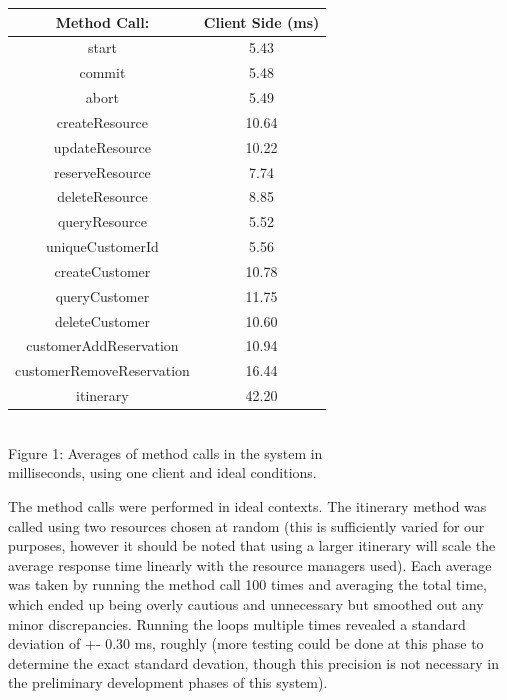 \documentclass[letterpaper,12pt]{article}
\begin{document}
	\begin{center}
		\begin{tabular}{ |c|c| } 
			\hline
			Method Call: & Client Side (ms) \\
			\hline
			start & 5.43  \\ 
			commit & 5.48  \\ 
			abort & 5.49  \\ 
			createResource & 10.64  \\ 
			updateResource & 10.22  \\ 
			reserveResource & 7.74  \\ 
			deleteResource & 8.85  \\ 
			queryResource & 5.52  \\ 
			uniqueCustomerId & 5.56  \\ 
			createCustomer & 10.78 \\
			queryCustomer & 11.75 \\ 
			deleteCustomer & 10.60 \\ 
			customerAddReservation & 10.94 \\ 
			customerRemoveReservation & 16.44 \\
			itinerary & 42.20\\
			\hline
		\end{tabular}\\
		Figure 1: Averages of method calls in the system in \\milliseconds, using one client and ideal conditions.
	\end{center}
	The method calls were performed in ideal contexts. The itinerary method was called using two resources chosen at random (this is sufficiently varied for our purposes, however it should be noted that using a larger itinerary will scale the average response time linearly with the resource managers used). Each average was taken by running the method call 100 times and averaging the total time, which ended up being overly cautious and unnecessary but smoothed out any minor discrepancies. Running the loops multiple times revealed a standard deviation of +- 0.30 ms, roughly (more testing could be done at this phase to determine the exact standard devation, though this precision is not necessary in the preliminary development phases of this system).\\
	
\end{document}
